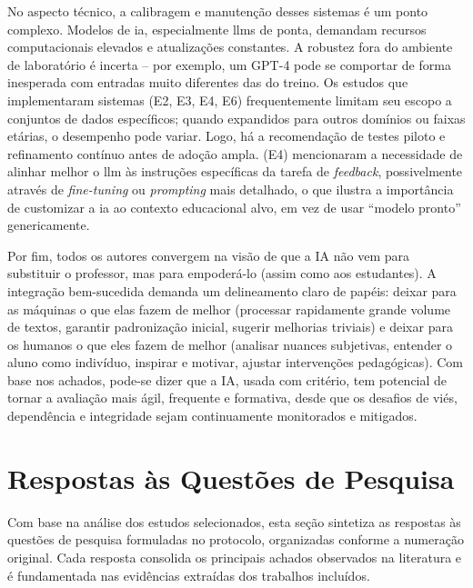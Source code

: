 No aspecto técnico, a calibragem e manutenção desses sistemas é um ponto complexo. Modelos de \gls{ia}, especialmente \gls{llm}s de ponta, demandam recursos computacionais elevados e atualizações constantes. A robustez fora do ambiente de laboratório é incerta – por exemplo, um GPT-4 pode se comportar de forma inesperada com entradas muito diferentes das do treino. Os estudos que implementaram sistemas (E2, E3, E4, E6) frequentemente limitam seu escopo a conjuntos de dados específicos; quando expandidos para outros domínios ou faixas etárias, o desempenho pode variar. Logo, há a recomendação de testes piloto e refinamento contínuo antes de adoção ampla.  (E4) mencionaram a necessidade de alinhar melhor o \gls{llm} às instruções específicas da tarefa de \textit{feedback}, possivelmente através de \textit{fine-tuning} ou \textit{prompting} mais detalhado, o que ilustra a importância de customizar a \gls{ia} ao contexto educacional alvo, em vez de usar “modelo pronto” genericamente.

Por fim, todos os autores convergem na visão de que a IA não vem para substituir o professor, mas para empoderá-lo (assim como aos estudantes). A integração bem-sucedida demanda um delineamento claro de papéis: deixar para as máquinas o que elas fazem de melhor (processar rapidamente grande volume de textos, garantir padronização inicial, sugerir melhorias triviais) e deixar para os humanos o que eles fazem de melhor (analisar nuances subjetivas, entender o aluno como indivíduo, inspirar e motivar, ajustar intervenções pedagógicas). Com base nos achados, pode-se dizer que a IA, usada com critério, tem potencial de tornar a avaliação mais ágil, frequente e formativa, desde que os desafios de viés, dependência e integridade sejam continuamente monitorados e mitigados.

\section{Respostas às Questões de Pesquisa}

Com base na análise dos estudos selecionados, esta seção sintetiza as respostas às questões de pesquisa formuladas no protocolo, organizadas conforme a numeração original. Cada resposta consolida os principais achados observados na literatura e é fundamentada nas evidências extraídas dos trabalhos incluídos.

